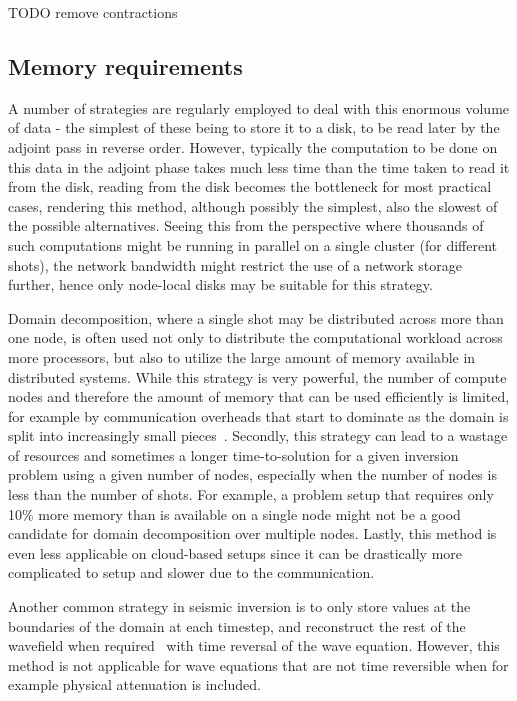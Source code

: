 TODO remove contractions

\subsection{Memory requirements}
A number of strategies are regularly employed to deal with this
enormous volume of data - the simplest of these being to store it to a
disk, to be read later by the adjoint pass in reverse order. However,
typically the computation to be done on this data in the adjoint phase
takes much less time than the time taken to read it from the disk,
reading from the disk becomes the bottleneck for most practical cases,
rendering this method, although possibly the simplest, also the
slowest of the possible alternatives. Seeing this from the perspective
where thousands of such computations might be running in parallel on a
single cluster (for different shots), the network bandwidth might
restrict the use of a network storage further, hence only node-local disks
may be suitable for this strategy. 

Domain decomposition, where a single shot may be distributed across more
than one node, is often used not only to distribute the computational
workload across more processors, but also to utilize the large amount of memory
available in distributed systems. While this strategy is very powerful, the
number of compute nodes and therefore the amount of memory that can be used
efficiently is limited, for example by communication overheads that start to
dominate as the domain is split into increasingly small
pieces~\cite{virieux2009seismic}. Secondly, this strategy can lead to
a wastage of resources and sometimes a longer time-to-solution for a
given inversion problem using a given number of nodes, especially when
the number of nodes is less than the number of shots. For example, a
problem setup that requires only 10\% more memory than is available on
a single node might not be a good candidate for domain decomposition
over multiple nodes. Lastly, this method is even less applicable on
cloud-based setups since it can be drastically more complicated
to setup and slower due to the communication.


Another common strategy in seismic inversion is to only store values
at the boundaries of the domain at each timestep, and reconstruct the
rest of the wavefield when
required~\cite{clapp2009reverse,yang2014rtm} with time reversal of the
wave equation. However, this method is not applicable for wave
equations that are not time reversible when for example physical
attenuation is included.

